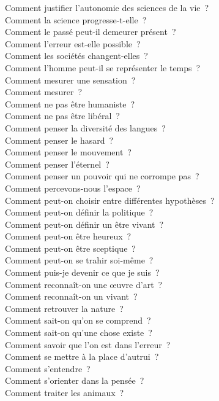 \documentclass[a4paper,12pt]{article}
\begin{document}
Comment justifier l'autonomie des sciences de la vie ? \\
Comment la science progresse-t-elle ? \\
Comment le passé peut-il demeurer présent ? \\
Comment l'erreur est-elle possible ? \\
Comment les sociétés changent-elles ? \\
Comment l'homme peut-il se représenter le temps ? \\
Comment mesurer une sensation ? \\
Comment mesurer ? \\
Comment ne pas être humaniste ? \\
Comment ne pas être libéral ? \\
Comment penser la diversité des langues ? \\
Comment penser le hasard ? \\
Comment penser le mouvement ? \\
Comment penser l'éternel ? \\
Comment penser un pouvoir qui ne corrompe pas ? \\
Comment percevons-nous l'espace ? \\
Comment peut-on choisir entre différentes hypothèses ? \\
Comment peut-on définir la politique ? \\
Comment peut-on définir un être vivant ? \\
Comment peut-on être heureux ? \\
Comment peut-on être sceptique ? \\
Comment peut-on se trahir soi-même ? \\
Comment puis-je devenir ce que je suis ? \\
Comment reconnaît-on une œuvre d'art ? \\
Comment reconnaît-on un vivant ? \\
Comment retrouver la nature ? \\
Comment sait-on qu'on se comprend ? \\
Comment sait-on qu'une chose existe ? \\
Comment savoir que l'on est dans l'erreur ? \\
Comment se mettre à la place d'autrui ? \\
Comment s'entendre ? \\
Comment s'orienter dans la pensée ? \\
Comment traiter les animaux ? \\
\end{document}
